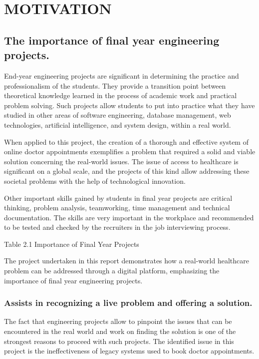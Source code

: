 \chapter{MOTIVATION}

\section{The importance of final year engineering projects.}

End-year engineering projects are significant in determining the practice and professionalism of the students. They provide a transition point between theoretical knowledge learned in the process of academic work and practical problem solving. Such projects allow students to put into practice what they have studied in other areas of software engineering, database management, web technologies, artificial intelligence, and system design, within a real world.

When applied to this project, the creation of a thorough and effective system of online doctor appointments exemplifies a problem that required a solid and viable solution concerning the real-world issues. The issue of access to healthcare is significant on a global scale, and the projects of this kind allow addressing these societal problems with the help of technological innovation.

Other important skills gained by students in final year projects are critical thinking, problem analysis, teamworking, time management and technical documentation. The skills are very important in the workplace and recommended to be tested and checked by the recruiters in the job interviewing process.

Table 2.1 Importance of Final Year Projects

The project undertaken in this report demonstrates how a real-world healthcare problem can be addressed through a digital platform, emphasizing the importance of final year engineering projects.

\subsection{Assists in recognizing a live problem and offering a solution.}

The fact that engineering projects allow to pinpoint the issues that can be encountered in the real world and work on finding the solution is one of the strongest reasons to proceed with such projects. The identified issue in this project is the ineffectiveness of legacy systems used to book doctor appointments.

